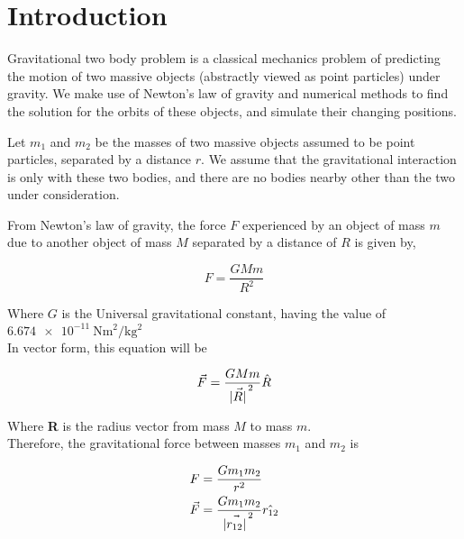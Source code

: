 \section{Introduction}

\drawBorder

Gravitational two body problem is a classical mechanics problem of predicting the motion of two massive objects (abstractly viewed as point particles) under gravity. We make use of Newton's law of gravity and numerical methods to find the solution for the orbits of these objects, and simulate their changing positions.

\vspace{1cm}

Let $m_1$ and $m_2$ be the masses of two massive objects assumed to be point particles, separated by a distance $r$. We assume that the gravitational interaction is only with these two bodies, and there are no bodies nearby other than the two under consideration.

From Newton's law of gravity, the force $F$ experienced by an object of mass $m$ due to another object of mass $M$ separated by a distance of $R$ is given by,

\begin{equation}
    F = \frac{G M m}{R^2}
\end{equation}

Where $G$ is the Universal gravitational constant, having the value of
$\SI{6.674e-11}{\newton \metre^2 \per \kg ^2}$\\

In vector form, this equation will be

\begin{equation}
    \vec{F} = \frac{G M m}{\vec{\abs{R}}^{\, 2}} \hat{R}
\end{equation}

Where \textbf{R} is the radius vector from mass $M$ to mass $m$.\\

Therefore, the gravitational force between masses $m_1$ and $m_2$ is

\begin{equation}\label{force_eqn}
    \begin{split}
        F &= \frac{G m_1 m_2}{r^2}\\
        \vec{F} &= \frac{G m_1 m_2}{\vec{\abs{r_{12}}}^{\, 2}} \hat{r_{12}}
    \end{split}
\end{equation}

